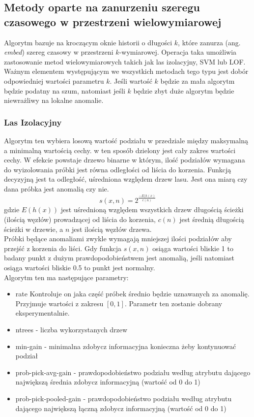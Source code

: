 \documentclass{article}
\begin{document}
\subsection{Metody oparte na zanurzeniu szeregu czasowego w przestrzeni wielowymiarowej}

Algorytm bazuje na kroczącym oknie historii o długości $k$, które zanurza (ang. \emph{embed}) szereg czasowy w przestrzeni $k$-wymiarowej. Operacja taka umożliwia zastosowanie metod wielowymiarowych takich jak las izolacyjny, SVM lub LOF. Ważnym elementem występującym we wszystkich metodach tego typu jest dobór odpowiedniej wartości parametru $k$. Jeśli wartość $k$ będzie za mała algorytm będzie podatny na szum, natomiast jeśli $k$ będzie zbyt duże algorytm będzie niewrażliwy na lokalne anomalie. 

\subsubsection{Las Izolacyjny}
 Algorytm ten wybiera losową wartość podziału w przedziale między maksymalną a minimalną wartością cechy. w ten sposób dzielony jest cały zakres wartości cechy. W efekcie powstaje drzewo binarne w którym, ilość podziałów wymagana do wyizolowania próbki jest równa odległości od liścia do korzenia. Funkcją decyzyjną jest ta odległość, uśredniona względem drzew lasu. Jest ona miarą czy dana próbka jest anomalią czy nie.
  \[s(x, n) = 2^{\frac{-E(h(x)}{c(n)}}\]
  gdzie $E(h(x))$ jest uśrednioną względem wszystkich drzew długością ścieżki (ilością węzłów) prowadzącej od liścia do korzenia, $c(n)$ jest średnią długością ścieżki w drzewie, a $n$ jest ilością węzłów drzewa. \\
  Próbki będące anomaliami zwykle wymagają mniejszej ilości podziałów aby przejść z korzenia do liści. Gdy funkcja $s(x, n)$ osiąga wartości bliskie 1 to badany punkt z dużym prawdopodobieństwem jest anomalią, jeśli natomiast osiąga wartości bliskie 0.5 to punkt jest normalny.  \\
  
  Algorytm ten ma następujące parametry:
  \begin{itemize}
      \item rate Kontroluje on jaka część próbek średnio będzie uznawanych za anomalię. Przyjmuje wartości z zakresu $[0,1]$. Parametr ten zostanie dobrany eksperymentalnie. 
      \item ntrees - liczba wykorzystanych drzew 
      \item min-gain - minimalna zdobycz informacyjna konieczna żeby kontynuować podział
      \item prob-pick-avg-gain - prawdopodobieństwo podziału według atrybutu dającego największą średnia zdobycz informacyjną (wartość od 0 do 1)
      \item prob-pick-pooled-gain - prawdopodobieństwo podziału według atrybutu dającego największą łączną zdobycz informacyjną (wartość od 0 do 1) %
  \end{itemize}
\end{document}
